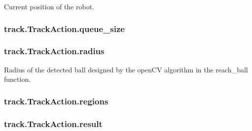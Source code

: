 Current position of the robot. 

\subsubsection[{\texorpdfstring{queue\+\_\+size}{queue_size}}]{\setlength{\rightskip}{0pt plus 5cm}track.\+Track\+Action.\+queue\+\_\+size\hspace{0.3cm}{\ttfamily [static]}}\hypertarget{classtrack_1_1TrackAction_a47112fa77bb24c45494449d781bd35c4}{}\label{classtrack_1_1TrackAction_a47112fa77bb24c45494449d781bd35c4}
\subsubsection[{\texorpdfstring{radius}{radius}}]{\setlength{\rightskip}{0pt plus 5cm}track.\+Track\+Action.\+radius\hspace{0.3cm}{\ttfamily [static]}}\hypertarget{classtrack_1_1TrackAction_a0773416696b3fd6ed1dff306eb26c84a}{}\label{classtrack_1_1TrackAction_a0773416696b3fd6ed1dff306eb26c84a}


Radius of the detected ball designed by the open\+CV algorithm in the reach\+\_\+ball function. 

\subsubsection[{\texorpdfstring{regions}{regions}}]{\setlength{\rightskip}{0pt plus 5cm}track.\+Track\+Action.\+regions\hspace{0.3cm}{\ttfamily [static]}}\hypertarget{classtrack_1_1TrackAction_aca76f9e5333f65cf2da37f2b90d5f193}{}\label{classtrack_1_1TrackAction_aca76f9e5333f65cf2da37f2b90d5f193}
\subsubsection[{\texorpdfstring{result}{result}}]{\setlength{\rightskip}{0pt plus 5cm}track.\+Track\+Action.\+result\hspace{0.3cm}{\ttfamily [static]}}\hypertarget{classtrack_1_1TrackAction_ae62bfb3233b566df94fde636d8d26877}{}\label{classtrack_1_1TrackAction_ae62bfb3233b566df94fde636d8d26877}

